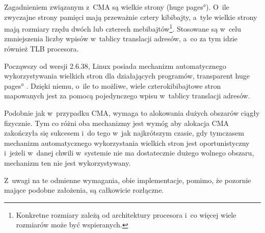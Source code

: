 Zagadnieniem związanym z~CMA są wielkie strony (\ang{huge pages}).
O~ile zwyczajne strony pamięci mają przeważnie cztery kibibajty,
a~tyle wielkie strony mają rozmiary rzędu dwóch lub czterech
mebibajtów\footnote{Konkretne rozmiary zależą od architektury
  procesora i~co więcej wiele rozmiarów może być wspieranych.}.
Stosowane są w~celu zmniejszenia liczby wpisów w~tablicy translacji
adresów, a~co za tym idzie również TLB procesora.

Począwszy od wersji 2.6.38, Linux posiada mechanizm automatycznego
wykorzystywania wielkich stron dla działających programów,
\ang{transparent huge pages} \cite{bib:v2.6.38}.  Dzięki niemu,
o~ile to możliwe, wiele czterokibibajtowe stron mapowanych jest za
pomocą pojedynczego wpisu w~tablicy translacji adresów.

Podobnie jak w~przypadku CMA, wymaga to alokowania dużych obszarów
ciągły fizycznie.  Tym co różni oba mechanizmy jest wymóg aby alokacja
CMA zakończyła się sukcesem i~do tego w~jak najkrótszym czasie, gdy
tymczasem mechanizm automatycznego wykorzystania wielkich stron jest
oportunistyczny i~jeżeli w~danej chwili w~systemie nie ma dostatecznie
dużego wolnego obszaru, mechanizm ten nie jest wykorzystywany.

Z~uwagi na te odmienne wymagania, obie implementacje, pomimo, że
pozornie mające podobne założenia, są całkowicie rozłączne.
